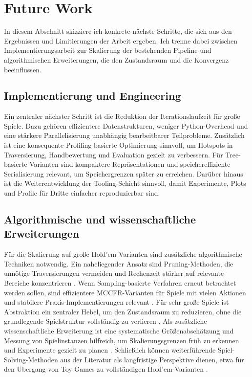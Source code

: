 \section{Future Work}
In diesem Abschnitt skizziere ich konkrete nächste Schritte, die sich aus den Ergebnissen und Limitierungen der Arbeit ergeben.
Ich trenne dabei zwischen Implementierungsarbeit zur Skalierung der bestehenden Pipeline und algorithmischen Erweiterungen, die den Zustandsraum und die Konvergenz beeinflussen.

\subsection{Implementierung und Engineering}
Ein zentraler nächster Schritt ist die Reduktion der Iterationslaufzeit für große Spiele.
Dazu gehören effizientere Datenstrukturen, weniger Python-Overhead und eine stärkere Parallelisierung unabhängig bearbeitbarer Teilprobleme.
Zusätzlich ist eine konsequente Profiling-basierte Optimierung sinnvoll, um Hotspots in Traversierung, Handbewertung und Evaluation gezielt zu verbessern.
Für Tree-basierte Varianten sind kompaktere Repräsentationen und speichereffiziente Serialisierung relevant, um Speichergrenzen später zu erreichen.
Darüber hinaus ist die Weiterentwicklung der Tooling-Schicht sinnvoll, damit Experimente, Plots und Profile für Dritte einfacher reproduzierbar sind.

\subsection{Algorithmische und wissenschaftliche Erweiterungen}
Für die Skalierung auf große Hold'em-Varianten sind zusätzliche algorithmische Techniken notwendig.
Ein naheliegender Ansatz sind Pruning-Methoden, die unnötige Traversierungen vermeiden und Rechenzeit stärker auf relevante Bereiche konzentrieren \cite{brownSandholm2015regretBasedPruning}.
Wenn Sampling-basierte Verfahren erneut betrachtet werden sollen, sind effizientere MCCFR-Varianten für Spiele mit vielen Aktionen und stabilere Praxis-Implementierungen relevant \cite{lanctot2009monte,gibson2012efficientMCCFRManyActions}.
Für sehr große Spiele ist Abstraktion ein zentraler Hebel, um den Zustandsraum zu reduzieren, ohne die grundlegende Spielstruktur vollständig zu verlieren \cite{gilpin2007lossless,billings2003approximating}.
Als zusätzliche wissenschaftliche Erweiterung ist eine systematische Größenabschätzung und Messung von Spielinstanzen hilfreich, um Skalierungsgrenzen früh zu erkennen und Experimente gezielt zu planen \cite{johanson2013sizeNoLimit}.
Schließlich können weiterführende Spiel-Solving-Methoden aus der Literatur als langfristige Perspektive dienen, etwa für den Übergang von Toy Games zu vollständigen Hold'em-Varianten \cite{bowling2015heads,brown2019superhuman}.

